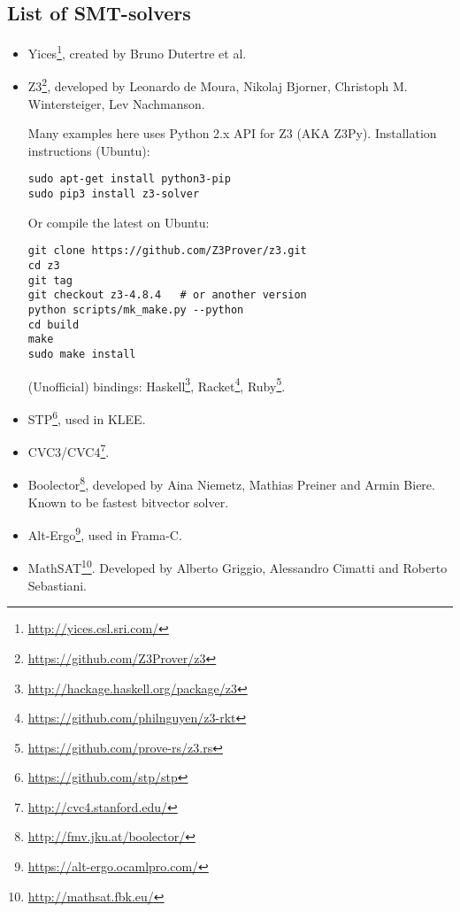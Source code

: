 \subsection{List of SMT-solvers}

\begin{itemize}

\item Yices\footnote{\url{http://yices.csl.sri.com/}}, created by Bruno Dutertre et al.

\item Z3\footnote{\url{https://github.com/Z3Prover/z3}},
developed by Leonardo de Moura, Nikolaj Bjorner, Christoph M. Wintersteiger, Lev Nachmanson.

Many examples here uses Python 2.x API for Z3 (AKA Z3Py).
Installation instructions (Ubuntu):

\begin{lstlisting}
sudo apt-get install python3-pip
sudo pip3 install z3-solver
\end{lstlisting}

Or compile the latest on Ubuntu:

\begin{lstlisting}
git clone https://github.com/Z3Prover/z3.git
cd z3
git tag
git checkout z3-4.8.4	# or another version
python scripts/mk_make.py --python
cd build
make
sudo make install
\end{lstlisting}

(Unofficial) bindings:
Haskell\footnote{\url{http://hackage.haskell.org/package/z3}},
Racket\footnote{\url{https://github.com/philnguyen/z3-rkt}},
Ruby\footnote{\url{https://github.com/prove-rs/z3.rs}}.

\item STP\footnote{\url{https://github.com/stp/stp}}, used in KLEE.

\item CVC3/CVC4\footnote{\url{http://cvc4.stanford.edu/}}.

\item Boolector\footnote{\url{http://fmv.jku.at/boolector/}}, developed by Aina Niemetz, Mathias Preiner and Armin Biere.
Known to be fastest bitvector solver.

\item Alt-Ergo\footnote{\url{https://alt-ergo.ocamlpro.com/}}, used in Frama-C.

\item MathSAT\footnote{\url{http://mathsat.fbk.eu/}}. Developed by Alberto Griggio, Alessandro Cimatti and Roberto Sebastiani.


\end{itemize}
